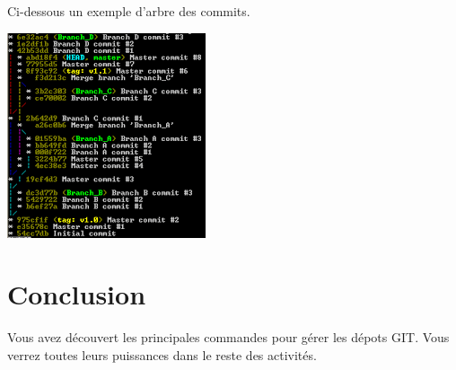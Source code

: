\documentclass[french, 12pt]{article}%
\begin{document}
\begin{itemize}
Ci-dessous un exemple d'arbre des commits.
\begin{center}
\includegraphics[scale=0.8]{./ressource/git_tree.png}
\end{center}

\end{itemize}



\section{Conclusion}

Vous avez découvert les principales commandes pour gérer les dépots GIT. Vous verrez toutes leurs puissances dans le reste des activités.
\end{document}
